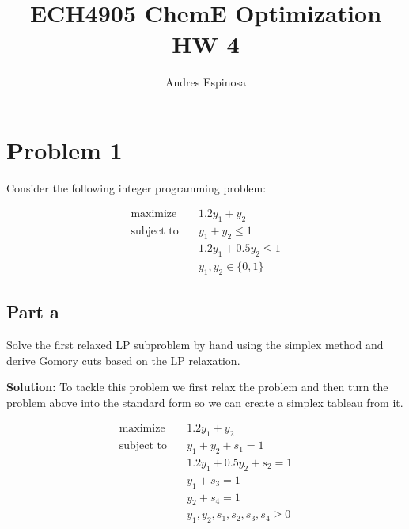 \documentclass[11pt]{article}
\title{ECH4905 ChemE Optimization HW 4}
\author{Andres Espinosa}
\begin{document}
\maketitle

\section{Problem 1}
Consider the following integer programming problem:


\begin{align*}
  \text{maximize} & \quad 1.2y_1 + y_2 \\
  \text{subject to} & \quad y_1 + y_2 \leq 1 \\
  & \quad 1.2y_1 + 0.5y_2 \leq 1 \\
  & \quad y_1, y_2 \in \{ 0,1 \}
\end{align*}

\subsection{Part a}
Solve the first relaxed LP subproblem by hand using the simplex method and derive Gomory cuts based on the LP relaxation.

\textbf{Solution:} To tackle this problem we first relax the problem and then turn the problem above into the standard form so we can create a simplex tableau from it.

\begin{align*}
    \text{maximize} & \quad 1.2y_1 + y_2 \\
    \text{subject to} & \quad y_1 + y_2 + s_1= 1 \\
    & \quad 1.2y_1 + 0.5y_2 + s_2 = 1 \\
    & \quad y_1 + s_3 = 1 \\
    & \quad y_2 + s_4 = 1 \\
    & \quad y_1, y_2, s_1, s_2, s_3, s_4 \geq 0
\end{align*}
\end{document}
